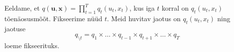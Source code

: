 Eeldame, et $q(\bm{u}, \bm{x}) = \prod_{t=1}^T{q_t(u_t, x_t)}$, kus iga $t$ korral on $q_t(u_t, x_t)$ tõenäosusmõõt. Fikseerime nüüd $t$. Meid huvitav jaotus on $q_t(u_t, x_t)$ ning jaotuse
$$q_{\setminus t} = q_1 \times \ldots \times q_{t-1} \times q_{t+1} \times \ldots \times q_T$$
loeme fikseerituks. 

